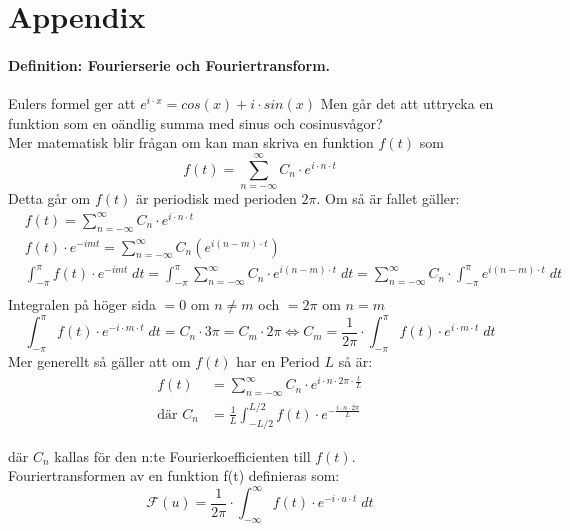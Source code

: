 \section*{Appendix}

\paragraph{Definition: Fourierserie och Fouriertransform. \\}
Eulers formel ger att $e^{i \cdot x} = cos(x) + i \cdot sin(x)$ Men går det att uttrycka en funktion som en oändlig summa
med sinus och cosinusvågor?\\
Mer matematisk blir frågan om kan man skriva en funktion $f(t)$ som 
\[
	f(t) = \sum_{n = - \infty}^\infty C_n \cdot e^{i \cdot n \cdot t}
\]
Detta går om $f(t)$ är periodisk med perioden $2 \pi$. Om så är fallet gäller:
\begin{align*}
	&f(t) = \sum_{n = - \infty}^\infty C_n \cdot e^{i \cdot n \cdot t} \\
	&f(t) \cdot e^{-imt} = \sum_{n = - \infty}^\infty C_n(e^{i(n - m) \cdot t}) \\
	&\int_{-\pi}^\pi f(t) \cdot e^{-imt}\; dt= \int_{-\pi}^\pi \sum_{n = - \infty}^\infty C_n \cdot e^{i(n - m) \cdot t}\; dt=
	\sum_{n = - \infty}^\infty C_n \cdot \int_{-\pi}^\pi e^{i (n - m) \cdot t}\; dt\\
\end{align*}
Integralen på höger sida $= 0 $ om $n \ne m$ och $= 2\pi $ om $n = m$
\[
	\int_{-\pi}^\pi f(t) \cdot e^{-i \cdot m \cdot t}\; dt 
		= C_n \cdot 3\pi = C_m \cdot 2\pi \Leftrightarrow C_m 
		= \frac 1 {2\pi} \cdot \int_{-\pi}^\pi f(t) \cdot e^{i \cdot m \cdot t}\; dt
\]
Mer generellt så gäller att om $f(t)$ har en Period $L$ så är:
\begin{align*}
	f(t) &= \sum_{n = - \infty}^\infty C_n \cdot e^{i \cdot n \cdot 2\pi \cdot \frac t L} \\ %
	\text{där } C_n &= \frac 1 L \int_{- L / 2}^{L / 2} f(t) \cdot e^{- \frac {i \cdot n \cdot 2\pi} {L}} 
\end{align*} %

där $C_n$ kallas för den n:te Fourierkoefficienten till $f(t)$. \\
Fouriertransformen av en funktion f(t) definieras som:
\[
	\mathcal{F}(u) = \frac 1 {2\pi} \cdot
	\int_{-\infty}^\infty f(t) \cdot e^{- i \cdot u \cdot t} \; dt
\]
\pagebreak
